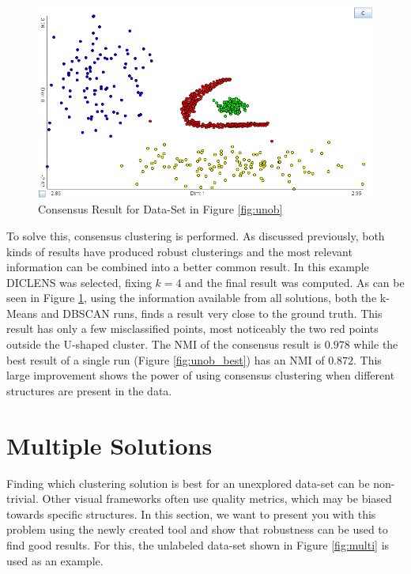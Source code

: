 \documentclass[
	a4paper,
	english,
	twoside,
	openright,               
	11pt                            
	]{report}
\begin{document}
\begin{figure}[h]
	\centering
	\includegraphics[scale=.4]{unob_consensus}
	\caption{Consensus Result for Data-Set in Figure \ref{fig:unob}}
	\label{fig:unob_consensus}
\end{figure}

To solve this, consensus clustering is performed. As discussed previously, both kinds of results have produced robust clusterings and the most relevant information can be combined into a better common result. In this example DICLENS was selected, fixing $k=4$ and the final result was computed. As can be seen in Figure \ref{fig:unob_consensus}, using the information available from all solutions, both the k-Means and DBSCAN runs, finds a result very close to the ground truth. This result has only a few misclassified points, most noticeably the two red points outside the U-shaped cluster. The NMI of the consensus result is $0.978$ while the best result of a single run (Figure \ref{fig:unob_best}) has an NMI of $0.872$. This large improvement shows the power of using consensus clustering when different structures are present in the data.


\section{Multiple Solutions}\label{sec:multi_sol}
Finding which clustering solution is best for an unexplored data-set can be non-trivial. Other visual frameworks often use quality metrics, which may be biased towards specific structures. In this section, we want to present you with this problem using the newly created tool and show that robustness can be used to find good results. For this, the unlabeled data-set shown in Figure \ref{fig:multi} is used as an example.
\end{document}
